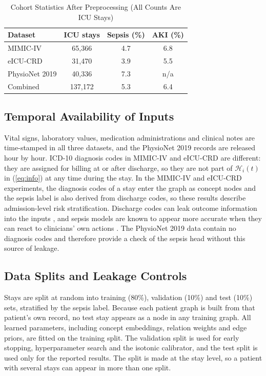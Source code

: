 \documentclass[conference]{IEEEtran}
\begin{document}
\begin{table}[t]
\caption{Cohort Statistics After Preprocessing (All Counts Are ICU Stays)}
\label{tab:cohort}
\centering
\footnotesize
\begin{tabular}{@{}lccc@{}}
\toprule
Dataset & ICU stays & Sepsis (\%) & AKI (\%) \\
\midrule
MIMIC-IV \cite{johnson2023mimiciv} & 65,366 & 4.7 & 6.8 \\
eICU-CRD \cite{pollard2018eicu} & 31,470 & 3.9 & 5.5 \\
PhysioNet 2019 \cite{reyna2020} & 40,336 & 7.3 & n/a \\
\midrule
Combined & 137,172 & 5.3 & 6.4 \\
\bottomrule
\end{tabular}
\end{table}

\subsection{Temporal Availability of Inputs}\label{sec:availability}
Vital signs, laboratory values, medication administrations and clinical notes are time-stamped in all three datasets, and the PhysioNet 2019 records are released hour by hour. ICD-10 diagnosis codes in MIMIC-IV and eICU-CRD are different: they are assigned for billing at or after discharge, so they are not part of $\mathcal{H}_i(t)$ in (\ref{eq:info}) at any time during the stay. In the MIMIC-IV and eICU-CRD experiments, the diagnosis codes of a stay enter the graph as concept nodes and the sepsis label is also derived from discharge codes, so these results describe admission-level risk stratification. Discharge codes can leak outcome information into the inputs \cite{kapoor2023}, and sepsis models are known to appear more accurate when they can react to clinicians' own actions \cite{kamran2024}. The PhysioNet 2019 data contain no diagnosis codes and therefore provide a check of the sepsis head without this source of leakage.

\subsection{Data Splits and Leakage Controls}\label{sec:splits}
Stays are split at random into training (80\%), validation (10\%) and test (10\%) sets, stratified by the sepsis label. Because each patient graph is built from that patient's own record, no test stay appears as a node in any training graph. All learned parameters, including concept embeddings, relation weights and edge priors, are fitted on the training split. The validation split is used for early stopping, hyperparameter search and the isotonic calibrator, and the test split is used only for the reported results. The split is made at the stay level, so a patient with several stays can appear in more than one split.
\end{document}
